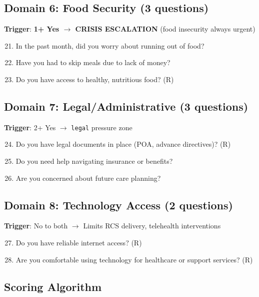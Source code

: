 \documentclass{article}
\begin{document}
\subsection*{Domain 6: Food Security (3 questions)}
\textbf{Trigger}: \textbf{1+ Yes $\rightarrow$ CRISIS ESCALATION} (food insecurity always urgent)

\begin{enumerate}
    \setcounter{enumi}{20}
    \item In the past month, did you worry about running out of food?
    \item Have you had to skip meals due to lack of money?
    \item Do you have access to healthy, nutritious food? (R)
\end{enumerate}

\subsection*{Domain 7: Legal/Administrative (3 questions)}
\textbf{Trigger}: 2+ Yes $\rightarrow$ \texttt{legal} pressure zone

\begin{enumerate}
    \setcounter{enumi}{23}
    \item Do you have legal documents in place (POA, advance directives)? (R)
    \item Do you need help navigating insurance or benefits?
    \item Are you concerned about future care planning?
\end{enumerate}

\subsection*{Domain 8: Technology Access (2 questions)}
\textbf{Trigger}: No to both $\rightarrow$ Limits RCS delivery, telehealth interventions

\begin{enumerate}
    \setcounter{enumi}{26}
    \item Do you have reliable internet access? (R)
    \item Are you comfortable using technology for healthcare or support services? (R)
\end{enumerate}

\subsection*{Scoring Algorithm}
\end{document}
